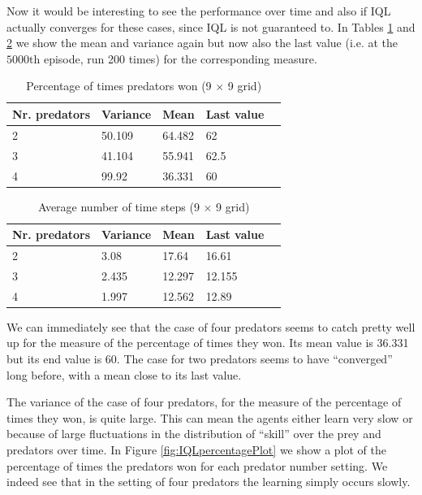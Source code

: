 \FloatBarrier

Now it would be interesting to see the performance over time and also if IQL actually converges for these cases, since IQL is not guaranteed to.
In Tables \ref{tab:percentage} and \ref{tab:timeSteps} we show the mean and variance again but now also the last value (i.e. at the $5000\mathrm{th}$ episode, run 200 times) for the corresponding  measure.

\begin{table}[hbt]
\centering
\begin{tabular}{lllll}
 Nr. predators  &  Variance& Mean & Last value   \\ 
\hline   
 2 & 50.109 & 64.482 & 62   \\ 
 3 & 41.104 & 55.941 & 62.5   \\ 
 4 & 99.92  & 36.331 & 60   \\  
\end{tabular} 
\caption{Percentage of times predators won (9 $\times$ 9 grid)}
\label{tab:percentage}
\end{table}

\begin{table}[hbt]
\centering
\begin{tabular}{lllll}
 Nr. predators  &  Variance& Mean & Last value   \\ 
\hline   
 2 &3.08 & 17.64 & 16.61   \\ 
 3 & 2.435 & 12.297 & 12.155   \\ 
 4 & 1.997  & 12.562 & 12.89   \\  
\end{tabular} 
\caption{Average number of time steps  (9 $\times$ 9 grid)}
\label{tab:timeSteps}
\end{table}

We can immediately see that the case of four predators seems to catch pretty well up for the measure of the percentage of times they won. Its mean value is 36.331 but its end value is 60. The case for two predators seems to have ``converged'' long before, with a mean close to its last value.

The variance of the case of four predators, for the measure of the percentage of times they won, is quite large.
This can mean the agents either learn very slow or because of large fluctuations in the distribution of ``skill'' over the prey and predators over time. In Figure \ref{fig:IQLpercentagePlot} we show a plot of the percentage of times the predators won for each predator number setting. We indeed see that in the setting of four predators the learning simply occurs slowly.


